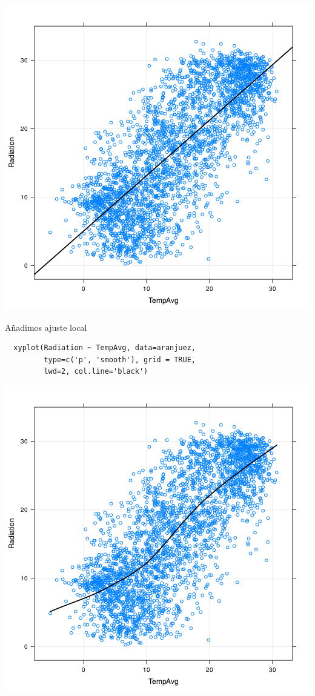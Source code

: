 \documentclass[xcolor={usenames,svgnames,dvipsnames}]{beamer}
\begin{document}
\begin{frame}[label={sec:orgheadline14}]{}
\includegraphics[width=.9\linewidth]{figs/xyplotPRG.png}
\end{frame}



\begin{frame}[fragile,label={sec:orgheadline15}]{Añadimos ajuste local}
 \lstset{language=R,label= ,caption= ,captionpos=b,numbers=none}
\begin{lstlisting}
  xyplot(Radiation ~ TempAvg, data=aranjuez,
         type=c('p', 'smooth'), grid = TRUE,
         lwd=2, col.line='black')
\end{lstlisting}
\end{frame}

\begin{frame}[label={sec:orgheadline16}]{}
\includegraphics[width=.9\linewidth]{figs/xyplotSmooth.png}
\end{frame}
\end{document}
